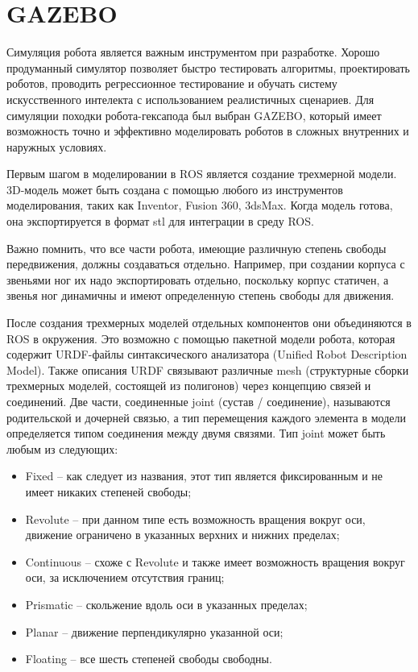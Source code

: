 \section{GAZEBO}

Симуляция робота является важным инструментом при разработке. Хорошо продуманный симулятор позволяет быстро тестировать алгоритмы, проектировать роботов, проводить регрессионное тестирование и обучать систему искусственного интелекта с использованием реалистичных сценариев. Для симуляции походки робота-гексапода был выбран GAZEBO, который имеет возможность точно и эффективно моделировать роботов в сложных внутренних и наружных условиях.

Первым шагом в моделировании в ROS является создание трехмерной модели. 3D-модель может быть создана с помощью любого из инструментов моделирования, таких как Inventor, Fusion 360, 3dsMax. Когда модель готова, она экспортируется в формат stl для интеграции в среду ROS. 

Важно помнить, что все части робота, имеющие различную степень свободы передвижения, должны создаваться отдельно. Например, при создании корпуса с звеньями ног их надо экспортировать отдельно, поскольку корпус статичен, а звенья ног динамичны и имеют определенную степень свободы для движения.

После создания трехмерных моделей отдельных компонентов они объединяются в ROS в окружения. Это возможно с помощью пакетной модели робота, которая содержит URDF-файлы синтаксического анализатора (Unified Robot Description Model). Также описания URDF связывают различные mesh (структурные сборки трехмерных моделей, состоящей из полигонов) через концепцию связей и соединений. Две части, соединенные joint (сустав / соединение), называются родительской и дочерней связью, а тип перемещения каждого элемента в модели определяется типом соединения между двумя связями. Тип joint может быть любым из следующих:

\begin{itemize}
	\item Fixed – как следует из названия, этот тип является фиксированным и не имеет никаких степеней свободы;
	\item Revolute – при данном типе есть возможность вращения вокруг оси, движение ограничено в указанных верхних и нижних пределах;
	\item Continuous – схоже с Revolute и также имеет возможность вращения вокруг оси, за исключением отсутствия границ;
	\item Prismatic – скольжение вдоль оси в указанных пределах;
	\item Planar – движение перпендикулярно указанной оси;
	\item Floating – все шесть степеней свободы свободны.
\end{itemize}

